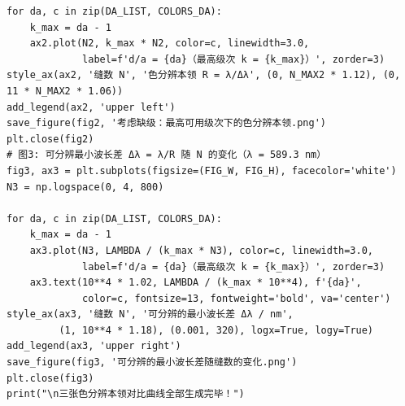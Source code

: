 \documentclass[12pt,a4paper]{ctexrep}
\begin{document}
\begin{lstlisting}[style=pycode]
for da, c in zip(DA_LIST, COLORS_DA):
    k_max = da - 1
    ax2.plot(N2, k_max * N2, color=c, linewidth=3.0,
             label=f'd/a = {da}（最高级次 k = {k_max}）', zorder=3)
style_ax(ax2, '缝数 N', '色分辨本领 R = λ/Δλ', (0, N_MAX2 * 1.12), (0, 11 * N_MAX2 * 1.06))
add_legend(ax2, 'upper left')
save_figure(fig2, '考虑缺级：最高可用级次下的色分辨本领.png')
plt.close(fig2)
# 图3: 可分辨最小波长差 Δλ = λ/R 随 N 的变化（λ = 589.3 nm）
fig3, ax3 = plt.subplots(figsize=(FIG_W, FIG_H), facecolor='white')
N3 = np.logspace(0, 4, 800)

for da, c in zip(DA_LIST, COLORS_DA):
    k_max = da - 1
    ax3.plot(N3, LAMBDA / (k_max * N3), color=c, linewidth=3.0,
             label=f'd/a = {da}（最高级次 k = {k_max}）', zorder=3)
    ax3.text(10**4 * 1.02, LAMBDA / (k_max * 10**4), f'{da}',
             color=c, fontsize=13, fontweight='bold', va='center')
style_ax(ax3, '缝数 N', '可分辨的最小波长差 Δλ / nm',
         (1, 10**4 * 1.18), (0.001, 320), logx=True, logy=True)
add_legend(ax3, 'upper right')
save_figure(fig3, '可分辨的最小波长差随缝数的变化.png')
plt.close(fig3)
print("\n三张色分辨本领对比曲线全部生成完毕！")
\end{lstlisting}
\end{document}
